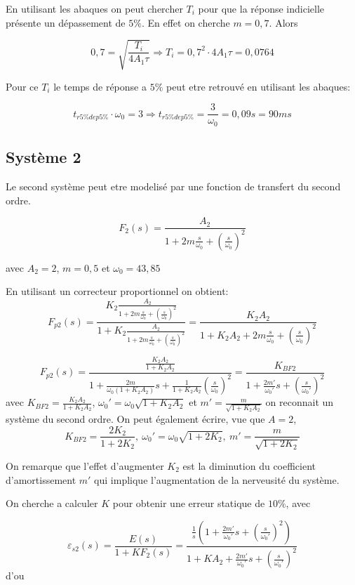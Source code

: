 \documentclass[12pt, a4paper]{report}
\begin{document}
En utilisant les abaques on peut chercher $T_i$ pour que la réponse indicielle
présente un dépassement de $5\%$. En effet on cherche $m = 0,7$. Alors

\[
    0,7 = \sqrt{\frac{T_i}{4 A_1 \tau}} \Rightarrow T_i = 0,7^2 \cdot 4 A_1 \tau = 0,0764  
\]

Pour ce $T_i$ le temps de réponse a $5\%$ peut etre retrouvé en utilisant les abaques:

\[
    t_{r5\%dep5\%} \cdot \omega_0 = 3 \Rightarrow t_{r5\%dep5\%} = \frac{3}{\omega_0} = 0,09s = 90ms
\]

\subsection{Système 2}

Le second système peut etre modelisé par une fonction de transfert du second ordre.

\[
    F_2(s) = \frac{A_2}{1 + 2 m \frac{s}{\omega_0} + \left( \frac{s}{\omega_0}\right)^2}
\]

avec $A_2 = 2$, $m = 0,5$ et $\omega_0 = 43,85$

En utilisant un correcteur proportionnel on obtient:
\[
    F_{p2}(s) = \frac{K_2 \frac{A_2}{1 + 2 m \frac{s}{\omega_0} + \left( \frac{s}{\omega_0}\right)^2}}{1 + K_2 \frac{A_2}{1 + 2 m \frac{s}{\omega_0} + \left( \frac{s}{\omega_0}\right)^2 }} = \frac{K_2 A_2}{1 + K_2A_2 + 2m \frac{s}{\omega_0} + \left( \frac{s}{\omega_0}\right)^2} 
\]

\[
    F_{p2}(s)  = \frac{\frac{K_2A_2}{1 + K_2A_2}}{1 + \frac{2m}{\omega_0(1 + K_2A_2)}s + \frac{1}{1 + K_2A_2} \left( \frac{s}{\omega_0}\right)^2} = \frac{K_{BF2}}{1 + \frac{2m'}{\omega_0'}s + \left( \frac{s}{\omega_0'}\right)^2}
\]
avec $K_{BF2} = \frac{K_2A_2}{1 + K_2A_2}$, $\omega_0' = \omega_0 \sqrt{1 + K_2A_2}$ et $m' = \frac{m}{\sqrt{1 + K_2A_2}}$ on reconnait un système du second ordre. On peut également écrire, vue que $A = 2$,
\[
    K_{BF2} = \frac{2K_2}{1 + 2K_2}, \ \omega_0' = \omega_0 \sqrt{1 + 2K_2},\ m' = \frac{m}{\sqrt{1 + 2K_2}}
\]

On remarque que l'effet d'augmenter $K_2$ est la diminution du coefficient d'amortissement $m'$ qui implique
l'augmentation de la nerveusité du système.

On cherche a calculer $K$ pour obtenir une erreur statique de $10\%$, avec

\[
    \varepsilon_{s2} (s) = \frac{E(s)}{1 + KF_{2}(s)} = \frac{\frac{1}{s}\left(1 + \frac{2m'}{\omega_0'}s + \left( \frac{s}{\omega_0'}\right)^2\right)}{1 + KA_2 + \frac{2m'}{\omega_0'}s + \left( \frac{s}{\omega_0'}\right)^2}
\]
d'ou
\end{document}
